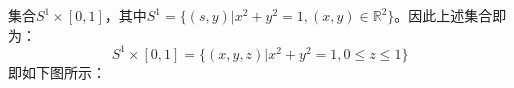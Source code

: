 \documentclass[lang=cn,10pt,device=pad]{elegantbook}
\newcommand{\dkh}[1]{\{#1\}}
\begin{document}
\begin{example}
	集合$S^{1}\times [0,1]$，其中$S^{1}=\dkh{(s,y)|x^{2}+y^{2} = 1,(x,y)\in \mathbb{R}^{2}}$。因此上述集合即为：
	\begin{equation*}
		S^{1}\times [0,1] = \dkh{(x,y,z)|x^{2}+y^{2}=1,0\leq z\leq 1}
	\end{equation*}
	即如下图所示：
	\begin{figure}[h]
		\centering
		


\begin{tikzpicture}[x=0.75pt,y=0.75pt,yscale=-1,xscale=1]


\end{tikzpicture}
\end{figure}
\end{example}
\end{document}
